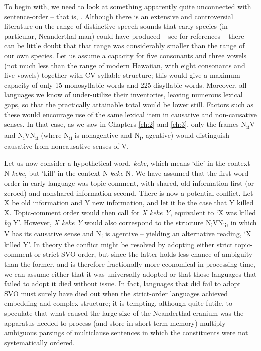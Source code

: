 To begin with, we need to look at something apparently quite unconnected with sentence-order -- that is, . Although there is an extensive and controversial literature on the range of distinctive speech sounds that early species (in particular, Neanderthal man) could have produced -- see \citet{Spuhler1977} for references -- there can be little doubt that that range was considerably smaller than the range of our own species. Let us assume a capacity for five consonants and three vowels (not much less than the range of modern Hawaiian, with eight consonants and five vowels) together with CV syllable structure; this would give a maximum capacity of only 15 monosyllabic words and 225 disyllabic words. Moreover, all languages we know of under-utilize their inventories, leaving numerous lexical gaps, so that the practically attainable total would be lower still. Factors such as these would encourage use of the same lexical item in causative and non-causative senses. In that case, as we saw in Chapters \ref{ch:2} and \ref{ch:3}, only the frames N\textsubscript{ii}V and N\textsubscript{i}VN\textsubscript{ii} (where N\textsubscript{ii} is nonagentive and N\textsubscript{i}, agentive) would distinguish causative from noncausative senses of V.

Let us now consider a hypothetical word, \textit{keke}, which means `die' in the context N \textit{keke}, but `kill' in the context N \textit{keke} N. We have assumed that the first word-order in early language was topic-comment,
with shared, old information first (or zeroed) and nonshared information second. There is now a potential conflict. Let X be old information and Y new information, and let it be the case that Y killed X. Topic-comment order would then call for \textit{X keke Y}, equivalent to `X was killed \textit{by} Y'. However, \textit{X keke Y} would also correspond to the structure N\textsubscript{i}VN\textsubscript{ii}, in which V has its causative sense and N\textsubscript{i} is agentive -- yielding an alternative reading, `X killed Y'. In theory the conflict might be resolved by adopting either strict topic-comment or strict SVO order, but since the latter holds less chance of ambiguity than the former, and is therefore fractionally more economical in processing time, we can assume either that it was universally adopted or that those languages that failed to adopt it died without issue. In fact, languages that did fail to adopt SVO must surely have died out when the strict-order languages achieved embedding and complex structure; it is tempting, although quite futile, to speculate that what caused the large size of the Neanderthal cranium was the apparatus needed to process (and store in short-term memory) multiply-ambiguous parsings of multiclause sentences in which the constituents were not systematically ordered.

